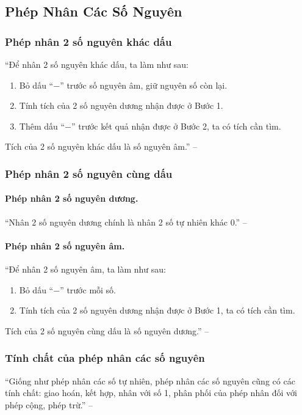 \documentclass{article}
\numberwithin{equation}{section}
\begin{document}

\subsection{Phép Nhân Các Số Nguyên}

\subsubsection{Phép nhân 2 số nguyên khác dấu}
``Để nhân 2 số nguyên khác dấu, ta làm như sau:
\begin{enumerate}
	\item Bỏ dấu ``$-$'' trước số nguyên âm, giữ nguyên số còn lại.
	\item Tính tích của 2 số nguyên dương nhận được ở Bước 1.
	\item Thêm dấu ``$-$'' trước kết quả nhận được ở Bước 2, ta có tích cần tìm.
\end{enumerate}
Tích của 2 số nguyên khác dấu là số nguyên âm.'' -- \cite[p. 80]{SGK_Toan_6_Canh_Dieu_tap_1}

\subsubsection{Phép nhân 2 số nguyên cùng dấu}

\paragraph{Phép nhân 2 số nguyên dương.} ``Nhân 2 số nguyên dương chính là nhân 2 số tự nhiên khác 0.'' -- \cite[p. 81]{SGK_Toan_6_Canh_Dieu_tap_1}

\paragraph{Phép nhân 2 số nguyên âm.} ``Để nhân 2 số nguyên âm, ta làm như sau:
\begin{enumerate}
	\item Bỏ dấu ``$-$'' trước mỗi số.
	\item Tính tích của 2 số nguyên dương nhận được ở Bước 1, ta có tích cần tìm.
\end{enumerate}
Tích của 2 số nguyên cùng dấu là số nguyên dương.'' -- \cite[p. 81]{SGK_Toan_6_Canh_Dieu_tap_1}

\subsubsection{Tính chất của phép nhân các số nguyên}
``Giống như phép nhân các số tự nhiên, phép nhân các số nguyên cũng có các tính chất: giao hoán, kết hợp, nhân với số 1, phân phối của phép nhân đối với phép cộng, phép trừ.'' -- \cite[p. 82]{SGK_Toan_6_Canh_Dieu_tap_1}
\end{document}
